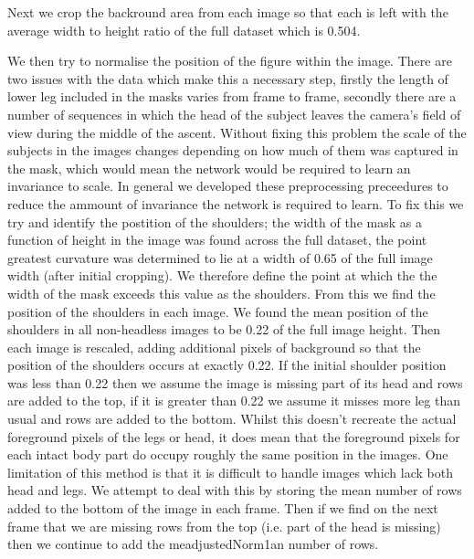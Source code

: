 \documentclass[11pt]{article} %
\begin{document}
Next we crop the backround area from each image so that each is left with the average width to height ratio of the full dataset which is 0.504.

We then try to normalise the position of the figure within the image. There are two issues with the data which make this a necessary step, firstly the length of lower leg included in the masks varies from frame to frame, secondly there are a number of sequences in which the head of the subject leaves the camera's field of view during the middle of the ascent. Without fixing this problem the scale of the subjects in the images changes depending on how much of them was captured in the mask, which would mean the network would be required to learn an invariance to scale. In general we developed these preprocessing preceedures to reduce the ammount of invariance the network is required to learn. To fix this we try and identify the postition of the shoulders; the width of the mask as a function of height in the image was found across the full dataset, the point greatest curvature was determined to lie at a width of 0.65 of the full image width (after initial cropping). We therefore define the point at which the the width of the mask exceeds this value as the shoulders. From this we find the position of the shoulders in each image. We found the mean position of the shoulders in all non-headless images to be 0.22 of the full image height. Then each image is rescaled, adding additional pixels of background so that the position of the shoulders occurs at exactly 0.22. If the initial shoulder position was less than 0.22 then we assume the image is missing part of its head and rows are added to the top, 
if it is greater than 0.22 we assume it misses more leg than usual and rows are added to the bottom. Whilst this doesn't recreate the actual foreground pixels of the legs or head, it does mean that the foreground pixels for each intact body part do occupy roughly the same position in the images. One limitation of this method is that it is difficult to handle images which lack both head and legs. We attempt to deal with this by storing the mean number of rows added to the bottom of the image in each frame. Then if we find on the next frame that we are missing rows from the top (i.e. part of the head is missing) then we continue to add the meadjustedNorm1an number of rows.
\end{document}

